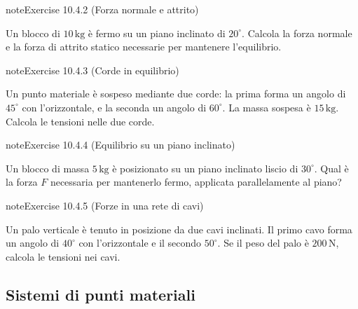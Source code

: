 \documentclass[letterpaper,10pt,italian]{jupyterBook}
\begin{document}
\begin{sphinxadmonition}{note}{Exercise 10.4.2 (Forza normale e attrito)}



\sphinxAtStartPar
Un blocco di \(10 \, \text{kg}\) è fermo su un piano inclinato di \(20^\circ\). Calcola la forza normale e la forza di attrito statico necessarie per mantenere l’equilibrio.
\end{sphinxadmonition}
 \label{exercise:ch/mechanics/statics-problems-exercise-2}

\begin{sphinxadmonition}{note}{Exercise 10.4.3 (Corde in equilibrio)}



\sphinxAtStartPar
Un punto materiale è sospeso mediante due corde: la prima forma un angolo di \(45^\circ\) con l’orizzontale, e la seconda un angolo di \(60^\circ\). La massa sospesa è \(15 \, \text{kg}\). Calcola le tensioni nelle due corde.
\end{sphinxadmonition}
 \label{exercise:ch/mechanics/statics-problems-exercise-3}

\begin{sphinxadmonition}{note}{Exercise 10.4.4 (Equilibrio su un piano inclinato)}



\sphinxAtStartPar
Un blocco di massa \(5 \, \text{kg}\) è posizionato su un piano inclinato liscio di \(30^\circ\). Qual è la forza \(F\) necessaria per mantenerlo fermo, applicata parallelamente al piano?
\end{sphinxadmonition}
 \label{exercise:ch/mechanics/statics-problems-exercise-4}

\begin{sphinxadmonition}{note}{Exercise 10.4.5 (Forze in una rete di cavi)}



\sphinxAtStartPar
Un palo verticale è tenuto in posizione da due cavi inclinati. Il primo cavo forma un angolo di \(40^\circ\) con l’orizzontale e il secondo \(50^\circ\). Se il peso del palo è \(200 \, \text{N}\), calcola le tensioni nei cavi.
\end{sphinxadmonition}


\subsection{Sistemi di punti materiali}
\label{\detokenize{ch/mechanics/statics-problems:sistemi-di-punti-materiali}} \label{exercise:ch/mechanics/statics-problems-exercise-5}
\end{document}
